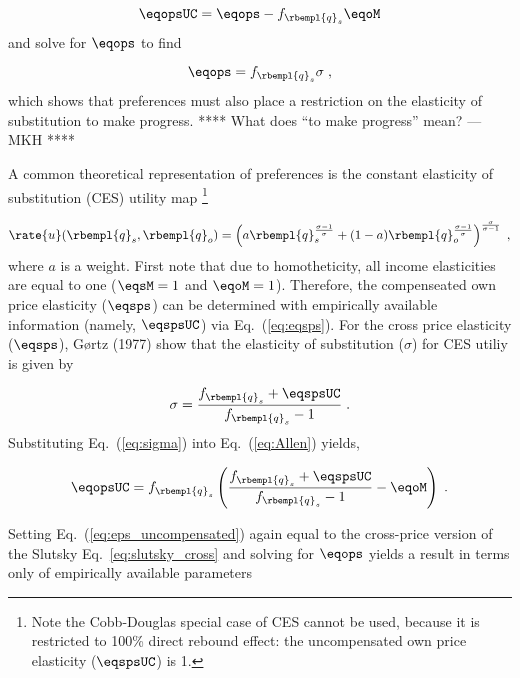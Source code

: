 \begin{equation} \label{eq:slutsky_cross}
  \eqopsUC = \eqops - f_{\rbempl{q}_s} \eqoM
\end{equation}
%
and solve for $\eqops$ to find

\begin{equation} \label{eq:eqops_general}
  \eqops = f_{\rbempl{q}_s} \sigma \; ,
\end{equation}
%
which shows that preferences 
must also place a restriction
on the elasticity of substitution to make progress.
**** What does ``to make progress'' mean? ---MKH ****

A common theoretical representation of preferences is
the constant elasticity of substitution (CES)
utility map \citep{Lemoine:2020aa}%
\footnote{
  Note the Cobb-Douglas special case of CES cannot be used, because
  it is restricted to 100\% direct rebound effect: 
  the uncompensated own price elasticity ($\eqspsUC$) is 1.
}

\begin{equation}
  \rate{u}(\rbempl{q}_s,\rbempl{q}_o) = 
      \left( a \rbempl{q}_s^{\frac{\sigma-1}{\sigma}} + (1-a) \rbempl{q}_o^{\frac{\sigma-1}{\sigma}}\right)                ^{\frac{\sigma}{\sigma-1}} \; ,
\end{equation}
%
where $a$ is a weight. 
First note that due to homotheticity,
all income elasticities are equal to one
($\eqsM = 1$ and $\eqoM = 1$).
Therefore,
the compenseated own price elasticity ($\eqsps$) can be 
determined with empirically available information (namely, $\eqspsUC$) via Eq.~(\ref{eq:eqsps}).
For the cross price elasticity ($\eqsps$), G{\o}rtz (1977) show that
the elasticity of substitution ($\sigma$) 
for CES utiliy is given by

\begin{equation} \label{eq:sigma}
  \sigma  = \frac{f_{\rbempl{q}_s} + \eqspsUC}{f_{\rbempl{q}_s} -1 } \; .
\end{equation}
%
Substituting Eq.~(\ref{eq:sigma}) into Eq.~(\ref{eq:Allen}) yields, 

\begin{equation} \label{eq:eps_uncompensated}
  \eqopsUC = f_{\rbempl{q}_s} \left( \frac{f_{\rbempl{q}_s} + \eqspsUC}{f_{\rbempl{q}_s} -1 } - \eqoM \right) \; .
\end{equation}

Setting Eq.~(\ref{eq:eps_uncompensated}) again equal to 
the cross-price version of the Slutsky Eq.~\ref{eq:slutsky_cross}
and solving for $\eqops$ yields a result in terms only
of empirically available parameters


